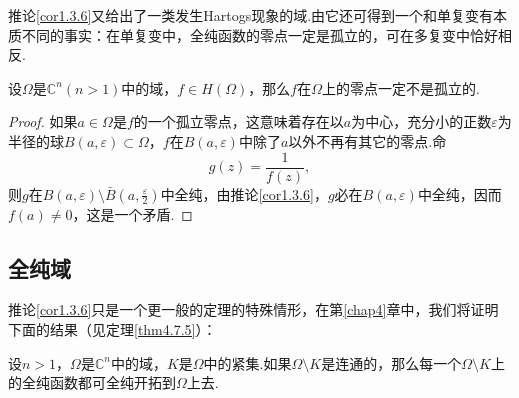 推论\ref{cor1.3.6}又给出了一类发生Hartogs现象的域.由它还可得到一个和单复变有本质不同的事实：在单复变中，全纯函数的零点一定是孤立的，可在多复变中恰好相反.
\begin{theorem}\label{thm1.3.7}
	设$\Omega$是$\mathbb{C}^n(n>1)$中的域，$f\in H(\Omega)$，那么$f$在$\Omega$上的零点一定不是孤立的.
\end{theorem}
\begin{proof}
	如果$a\in\Omega$是$f$的一个孤立零点，这意味着存在以$a$为中心，充分小的正数$\varepsilon$为半径的球$B(a,\varepsilon)\subset\Omega$，$f$在$B(a,\varepsilon)$中除了$a$以外不再有其它的零点.命
	\[g(z)=\frac1{f(z)},\]
	则$g$在$B(a,\varepsilon)\setminus\bar{B}\left(a,\frac{\varepsilon}{2}\right)$中全纯，由推论\ref{cor1.3.6}，$g$必在$B(a,\varepsilon)$中全纯，因而$f(a)\neq 0$，这是一个矛盾.
\end{proof}
\subsection{全纯域}
推论\ref{cor1.3.6}只是一个更一般的定理的特殊情形，在第\ref{chap4}章中，我们将证明下面的结果（见定理\ref{thm4.7.5}）：

设$n>1$，$\Omega$是$\mathbb{C}^n$中的域，$K$是$\Omega$中的紧集.如果$\Omega\setminus K$是连通的，那么每一个$\Omega\setminus K$上的全纯函数都可全纯开拓到$\Omega$上去.

